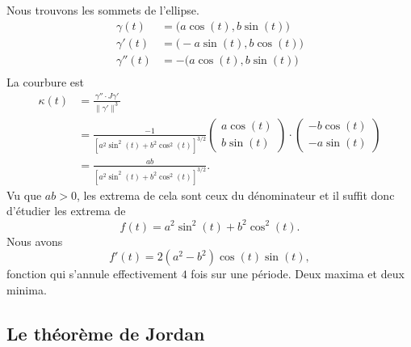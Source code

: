 \begin{example}
    Nous trouvons les sommets de l'ellipse.
    \begin{subequations}
        \begin{align}
            \gamma(t)&=\big( a\cos(t),b\sin(t) \big)\\
            \gamma'(t)&=\big( -a\sin(t),b\cos(t) \big)\\
            \gamma''(t)&=-\big( a\cos(t),b\sin(t) \big)\\
        \end{align}
    \end{subequations}
    La courbure est
    \begin{subequations}
        \begin{align}
        \kappa(t)&=\frac{ \gamma''\cdot J\gamma' }{ \| \gamma' \|^3 }\\
        &=\frac{-1}{ [a^2\sin^2(t)+b^2\cos^2(t)]^{3/2} }\begin{pmatrix}
            a\cos(t)    \\ 
            b\sin(t)    
        \end{pmatrix}\cdot\begin{pmatrix}
            -b\cos(t)    \\ 
            -a\sin(t)    
        \end{pmatrix}\\
        &=\frac{ ab }{  [a^2\sin^2(t)+b^2\cos^2(t)]^{3/2}  }.
        \end{align}
    \end{subequations}
    Vu que \( ab>0\), les extrema de cela sont ceux du dénominateur et il suffit donc d'étudier les extrema de
    \begin{equation}
        f(t)=a^2\sin^2(t)+b^2\cos^2(t).
    \end{equation}
    Nous avons 
    \begin{equation}
        f'(t)=2(a^2-b^2)\cos(t)\sin(t),
    \end{equation}
    fonction qui s'annule effectivement $4$ fois sur une période. Deux maxima et deux minima.
\end{example}


\subsection{Le théorème de Jordan}

